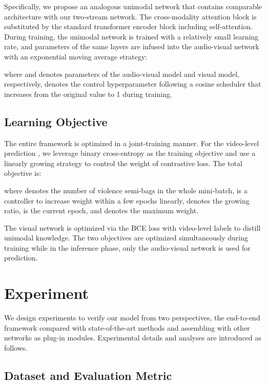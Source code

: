 \documentclass[sigconf]{acmart}
\begin{document}
Specifically, we propose an analogous unimodal network that contains comparable architecture with our two-stream network. The cross-modality attention block is substituted by the standard transformer encoder block including self-attention. During training, the unimodal network is trained with a relatively small learning rate, and parameters of the same layers are infused into the audio-visual network with an exponential moving average strategy:

where  and  denotes parameters of the audio-visual model and visual model, respectively,  denotes the control hyperparameter following a cosine scheduler that increases from the original value  to 1 during training.

\subsection{Learning Objective}

The entire framework is optimized in a joint-training manner. For the video-level prediction , we leverage binary cross-entropy  as the training objective and use a linearly growing strategy to control the weight of contrastive loss. The total objective is:


where  denotes the number of violence semi-bags in the whole mini-batch,  is a controller to increase weight within a few epochs linearly,  denotes the growing ratio,  is the current epoch, and  denotes the maximum weight. 

The visual network is optimized via the BCE loss with video-level labels to distill unimodal knowledge. The two objectives are optimized simultaneously during training while in the inference phase, only the audio-visual network is used for prediction.

\section{Experiment}
We design experiments to verify our model from two perspectives, the end-to-end framework compared with state-of-the-art methods and assembling with other networks as plug-in modules. Experimental details and analyses are introduced as follows.

\subsection{Dataset and Evaluation Metric}
\end{document}
